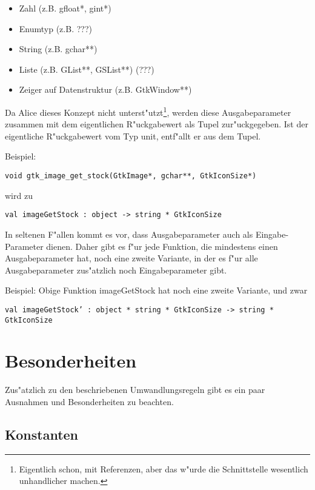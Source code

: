 \documentclass{article}
\begin{document}
\begin{itemize}
\item Zahl (z.B. gfloat*, gint*)
\item Enumtyp (z.B. ???)
\item String (z.B. gchar**)
\item Liste (z.B. GList**, GSList**) (???)
\item Zeiger auf Datenstruktur (z.B. GtkWindow**)
\end{itemize}

Da Alice dieses Konzept nicht unterst"utzt\footnote{Eigentlich schon, mit
Referenzen, aber das w"urde die Schnittstelle wesentlich unhandlicher machen.},
werden diese Ausgabeparameter zusammen mit dem eigentlichen R"uckgabewert
als Tupel zur"uckgegeben. Ist der eigentliche R"uckgabewert vom Typ unit,
entf"allt er aus dem Tupel.

Beispiel:

\texttt{void gtk\_image\_get\_stock(GtkImage*, gchar**, GtkIconSize*)}

wird zu 

\texttt{val imageGetStock : object -> string * GtkIconSize}

In seltenen F"allen kommt es vor, dass Ausgabeparameter auch als Eingabe-
Parameter dienen. Daher gibt es f"ur jede Funktion, die mindestens
einen Ausgabeparameter hat, noch eine zweite Variante, in der es f"ur
alle Ausgabeparameter zus"atzlich noch Eingabeparameter gibt.

Beispiel: Obige Funktion imageGetStock hat noch eine zweite Variante, und zwar

\texttt{val imageGetStock' : object * string * GtkIconSize 
        -> string * GtkIconSize}



\section{Besonderheiten}

Zus"atzlich zu den beschriebenen Umwandlungsregeln gibt es ein paar Ausnahmen
und Besonderheiten zu beachten.

\subsection{Konstanten}
\end{document}
